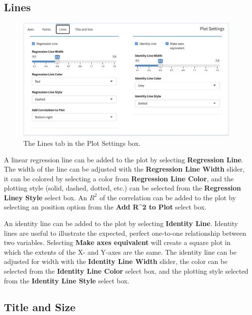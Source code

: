 \documentclass[
]{book}
\begin{document}
\hypertarget{lines}{%
\subsection{Lines}\label{lines}}

\begin{figure}
\centering
\includegraphics{images/Scatter_Lines.png}
\caption{The Lines tab in the Plot Settings box.}
\end{figure}

A linear regression line can be added to the plot by selecting \textbf{Regression Line}. The width of the line can be adjusted with the \textbf{Regression Line Width} slider, it can be colored by selecting a color from \textbf{Regression Line Color}, and the plotting style (solid, dashed, dotted, etc.) can be selected from the \textbf{Regression Liney Style} select box. An \(R^2\) of the correlation can be added to the plot by selecting an position option from the \textbf{Add R\^{}2 to Plot} select box.

An identity line can be added to the plot by selecting \textbf{Identity Line}. Identity lines are useful to illustrate the expected, perfect one-to-one relationship between two variables. Selecting \textbf{Make axes equivalent} will create a square plot in which the extents of the X- and Y-axes are the same. The identity line can be adjusted for width with the \textbf{Identity Line Width} slider, the color can be selected from the \textbf{Identity Line Color} select box, and the plotting style selected from the \textbf{Identity Line Style} select box.

\hypertarget{title-and-size-2}{%
\subsection{Title and Size}\label{title-and-size-2}}
\end{document}
